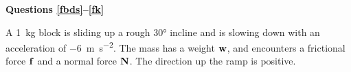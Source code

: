 \documentclass{../../../oss-apphys}
\begin{document}
\begin{multicols}{2}
\begin{enumerate}[resume,leftmargin=18pt]
    
  \end{enumerate}
  \columnbreak
  
  \textbf{Questions \ref{fbds}--\ref{fk}}

  A \SI{1}{\kilo\gram} block is sliding up a rough \ang{30} incline and is
  slowing down with an acceleration of \SI{-6}{\metre\per\second\squared}. The
  mass has a weight $\mathbf{w}$, and encounters a frictional force $\mathbf{f}$ and a
  normal force $\mathbf{N}$. The direction up the ramp is positive.
  

\end{multicols}
\end{document}
